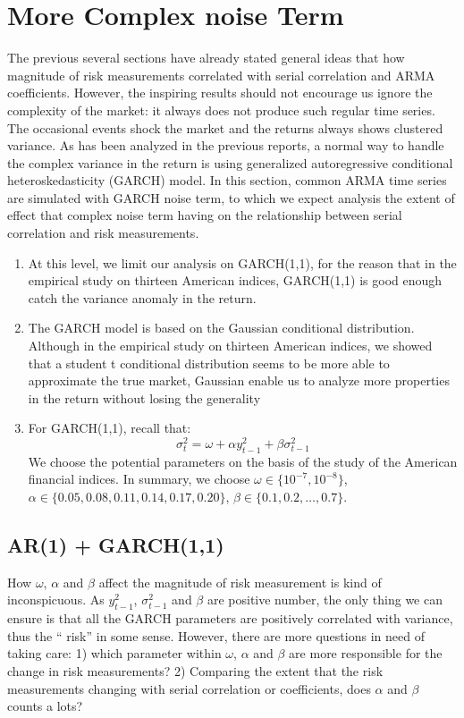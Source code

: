 \documentclass[11pt]{article}
\begin{document}
\section{More Complex noise Term}  %
The previous several sections have already stated general ideas that how magnitude of risk measurements correlated with serial correlation and ARMA coefficients. However, the inspiring results should not encourage us ignore the complexity of the market: it always does not produce such regular time series. The occasional events shock the market and the returns always shows clustered variance. As has been analyzed in the previous reports, a normal way to handle the complex variance in the return is using generalized autoregressive conditional heteroskedasticity (GARCH) model. In this section, common ARMA time series are simulated with GARCH noise term, to which we expect analysis the extent of effect that complex noise term having on the relationship between serial correlation and risk measurements.

\begin{enumerate}
\item At this level, we limit our analysis on GARCH(1,1), for the reason that in the empirical study on thirteen American indices, GARCH(1,1) is good enough catch the variance anomaly in the return.
\item The GARCH model is based on the Gaussian conditional distribution. Although in the empirical study on thirteen American indices, we showed that a student t conditional distribution seems to be more able to approximate the true market, Gaussian enable us to analyze more properties in the return without losing the generality
\item For GARCH(1,1), recall  that:
\[
\sigma^2_t = \omega + \alpha y_{t-1}^2 + \beta \sigma^2_{t-1}
\]
 We choose the potential parameters on the basis of  the study of the American financial indices. In summary, we choose $\omega \in \{10^{-7}, 10^{-8}\}$, $\alpha \in \{0.05, 0.08, 0.11, 0.14, 0.17, 0.20\}$, $\beta  \in \{0.1,0.2,\dots, 0.7\}$.
\end{enumerate}

\subsection{AR(1) + GARCH(1,1)}
How $\omega$, $\alpha$ and $\beta$ affect the magnitude of risk measurement is kind of inconspicuous. As $y_{t-1}^2$, $\sigma_{t-1}^2$ and $\beta$ are positive number, the only thing we can ensure is that all the GARCH parameters are positively correlated with variance, thus the `` risk'' in some sense. However, there are more questions in need of taking care: 1) which parameter within $\omega$, $\alpha$ and $\beta$ are more responsible for the change in risk measurements? 2) Comparing the extent that the risk measurements changing with serial correlation or coefficients, does $\alpha$ and $\beta$ counts a lots?
\end{document}
